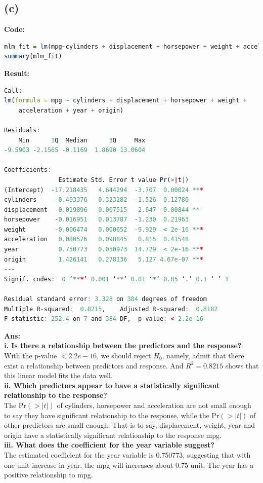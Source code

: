\documentclass[twoside]{homework}
\begin{document}
\subsection*{(c)}
\textbf{Code:}
\begin{lstlisting}[language=R]
mlm_fit = lm(mpg~cylinders + displacement + horsepower + weight + acceleration + year + origin)
summary(mlm_fit)
\end{lstlisting}
\textbf{Result:}
\begin{lstlisting}[language=R]
Call:
lm(formula = mpg ~ cylinders + displacement + horsepower + weight + 
    acceleration + year + origin)

Residuals:
    Min      1Q  Median      3Q     Max 
-9.5903 -2.1565 -0.1169  1.8690 13.0604 

Coefficients:
               Estimate Std. Error t value Pr(>|t|)    
(Intercept)  -17.218435   4.644294  -3.707  0.00024 ***
cylinders     -0.493376   0.323282  -1.526  0.12780    
displacement   0.019896   0.007515   2.647  0.00844 ** 
horsepower    -0.016951   0.013787  -1.230  0.21963    
weight        -0.006474   0.000652  -9.929  < 2e-16 ***
acceleration   0.080576   0.098845   0.815  0.41548    
year           0.750773   0.050973  14.729  < 2e-16 ***
origin         1.426141   0.278136   5.127 4.67e-07 ***
---
Signif. codes:  0 ‘***’ 0.001 ‘**’ 0.01 ‘*’ 0.05 ‘.’ 0.1 ‘ ’ 1

Residual standard error: 3.328 on 384 degrees of freedom
Multiple R-squared:  0.8215,	Adjusted R-squared:  0.8182 
F-statistic: 252.4 on 7 and 384 DF,  p-value: < 2.2e-16
\end{lstlisting}
\textbf{Ans:}\\
\textbf{i. Is there a relationship between the predictors and the response?}\\
With the p-value $< 2.2e-16$, we should reject $H_0$, namely, admit that there exist a relationship between predictors and response. And $R^2=0.8215$ shows that this linear model fits the data well. \\
\textbf{ii. Which predictors appear to have a statistically significant relationship to the response?}\\
The $\mathrm{Pr}(>|t|)$ of cylinders, horsepower and acceleration are not small enough to say they have significant relationship to the response, while the $\mathrm{Pr}(>|t|)$ of other predictors are small enough. That is to say, displacement, weight, year and origin have a statistically significant relationship to the response mpg. \\
\textbf{iii. What does the coefficient for the year variable suggest?}\\
The estimated coefficient for the year variable is 0.750773, suggesting that with one unit increase in year, the mpg will increases about 0.75 unit. The year has a positive relationship to mpg. 
\end{document}
